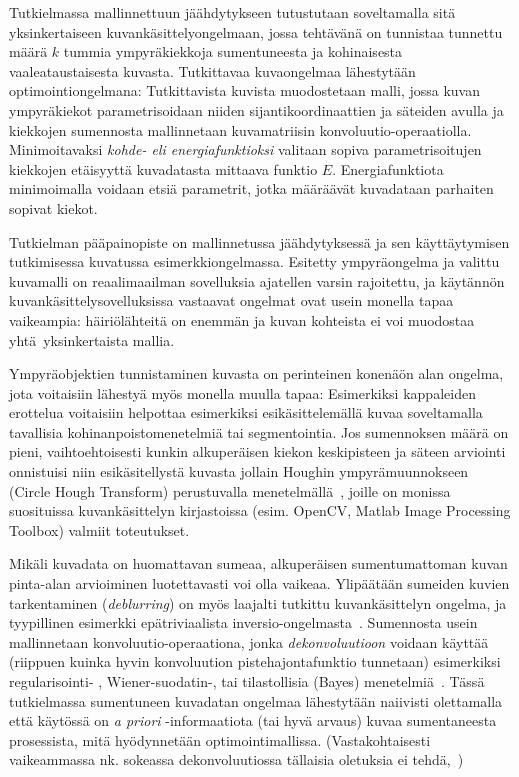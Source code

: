 Tutkielmassa mallinnettuun jäähdytykseen tutustutaan soveltamalla sitä yksinkertaiseen kuvankäsittelyongelmaan,
jossa tehtävänä on tunnistaa tunnettu määrä $k$ tummia ympyräkiekkoja sumentuneesta ja kohinaisesta vaaleataustaisesta kuvasta.
Tutkittavaa kuvaongelmaa lähestytään optimointiongelmana:
Tutkittavista kuvista muodostetaan malli, jossa kuvan ympyräkiekot parametrisoidaan niiden sijantikoordinaattien ja säteiden avulla
ja kiekkojen sumennosta mallinnetaan kuvamatriisin konvoluutio-operaatiolla.
Minimoitavaksi \emph{kohde- eli energiafunktioksi} valitaan sopiva parametrisoitujen kiekkojen etäisyyttä kuvadatasta mittaava funktio $E$.
Energiafunktiota minimoimalla voidaan etsiä parametrit, jotka määräävät kuvadataan parhaiten sopivat kiekot.

Tutkielman pääpainopiste on mallinnetussa jäähdytyksessä ja sen käyttäytymisen tutkimisessa kuvatussa esimerkkiongelmassa.
Esitetty ympyräongelma ja valittu kuvamalli on reaalimaailman sovelluksia ajatellen varsin rajoitettu,
ja käytännön kuvankäsittelysovelluksissa vastaavat ongelmat ovat usein monella tapaa vaikeampia:
häiriölähteitä on enemmän ja kuvan kohteista ei voi muodostaa yhtä yksinkertaista mallia.

Ympyräobjektien tunnistaminen kuvasta on perinteinen konenäön alan ongelma,
jota voitaisiin lähestyä myös monella muulla tapaa:
Esimerkiksi kappaleiden erottelua voitaisiin helpottaa esimerkiksi esikäsittelemällä kuvaa soveltamalla tavallisia kohinanpoistomenetelmiä tai segmentointia.
Jos sumennoksen määrä on pieni, vaihtoehtoisesti kunkin alkuperäisen kiekon keskipisteen ja säteen arviointi onnistuisi niin esikäsitellystä kuvasta jollain Houghin ympyrämuunnokseen (Circle Hough Transform) perustuvalla menetelmällä~\cite[ks esim][]{leavers92},
joille on monissa suosituissa kuvankäsittelyn kirjastoissa (esim. OpenCV, Matlab Image Processing Toolbox) valmiit toteutukset.

Mikäli kuvadata on huomattavan sumeaa, alkuperäisen sumentumattoman kuvan pinta-alan arvioiminen luotettavasti voi olla vaikeaa.
Ylipäätään sumeiden kuvien tarkentaminen (\emph{deblurring}) on myös laajalti tutkittu kuvankäsittelyn ongelma,
ja tyypillinen esimerkki epätriviaalista inversio-ongelmasta~\cite{muellersiltanen12}.
Sumennosta usein mallinnetaan konvoluutio-operaationa, jonka \emph{dekonvoluutioon} voidaan käyttää (riippuen kuinka hyvin konvoluution pistehajontafunktio tunnetaan) esimerkiksi regu\-la\-ri\-sointi- \cite{muellersiltanen12}, Wiener-suodatin-, tai tilastollisia (Bayes) menetelmiä~\cite{chaudhuri14}.
Tässä tutkielmassa sumentuneen kuvadatan ongelmaa lähestytään naiivisti olettamalla että käytössä on \emph{a priori} -informaatiota (tai hyvä arvaus) kuvaa sumentaneesta prosessista, mitä hyödynnetään optimointimallissa.
(Vastakohtaisesti vaikeammassa nk. sokeassa dekonvoluutiossa tällaisia oletuksia ei tehdä,~\cite[ks. esim][]{chaudhuri14})

